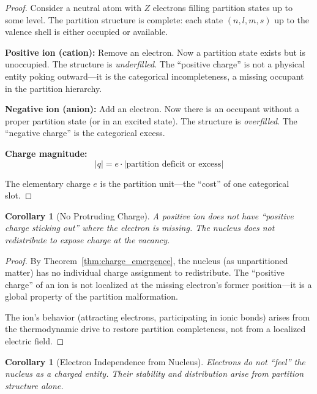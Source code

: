 \documentclass[twocolumn,10pt,a4paper]{article}
\newtheorem{corollary}[theorem]{Corollary}
\theoremstyle{definition}
\theoremstyle{remark}
\begin{document}
\begin{proof}
Consider a neutral atom with $Z$ electrons filling partition states up to some level. The partition structure is complete: each state $(n, l, m, s)$ up to the valence shell is either occupied or available.

\textbf{Positive ion (cation):}
Remove an electron. Now a partition state exists but is unoccupied. The structure is \emph{underfilled}. The ``positive charge'' is not a physical entity poking outward---it is the categorical incompleteness, a missing occupant in the partition hierarchy.

\textbf{Negative ion (anion):}
Add an electron. Now there is an occupant without a proper partition state (or in an excited state). The structure is \emph{overfilled}. The ``negative charge'' is the categorical excess.

\textbf{Charge magnitude:}
\begin{equation}
    |q| = e \cdot |\text{partition deficit or excess}|
\end{equation}

The elementary charge $e$ is the partition unit---the ``cost'' of one categorical slot.
\end{proof}

\begin{corollary}[No Protruding Charge]
\label{cor:no_protrusion}
A positive ion does not have ``positive charge sticking out'' where the electron is missing. The nucleus does not redistribute to expose charge at the vacancy.
\end{corollary}

\begin{proof}
By Theorem~\ref{thm:charge_emergence}, the nucleus (as unpartitioned matter) has no individual charge assignment to redistribute. The ``positive charge'' of an ion is not localized at the missing electron's former position---it is a global property of the partition malformation.

The ion's behavior (attracting electrons, participating in ionic bonds) arises from the thermodynamic drive to restore partition completeness, not from a localized electric field.
\end{proof}

\begin{corollary}[Electron Independence from Nucleus]
\label{cor:electron_independence}
Electrons do not ``feel'' the nucleus as a charged entity. Their stability and distribution arise from partition structure alone.
\end{corollary}
\end{document}
